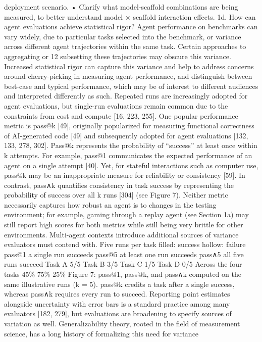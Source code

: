 deployment scenario.
• Clarify what model-scaffold combinations are being measured, to better understand model × scaffold
interaction effects.
1d. How can agent evaluations achieve statistical rigor?
Agent performance on benchmarks can vary widely, due to particular tasks selected into the benchmark, or
variance across different agent trajectories within the same task. Certain approaches to aggregating or
12
subsetting these trajectories may obscure this variance. Increased statistical rigor can capture this variance
and help to address concerns around cherry-picking in measuring agent performance, and distinguish
between best-case and typical performance, which may be of interest to different audiences and interpreted
differently as such.
Repeated runs are increasingly adopted for agent evaluations, but single-run evaluations remain common due
to the constraints from cost and compute [16, 223, 255]. One popular performance metric is pass@k [49],
originally popularized for measuring functional correctness of AI-generated code [49] and subsequently
adopted for agent evaluations [132, 133, 278, 302]. Pass@k represents the probability of “success” at least
once within k attempts. For example, pass@1 communicates the expected performance of an agent on a
single attempt [40]. Yet, for stateful interactions such as computer use, pass@k may be an inappropriate
measure for reliability or consistency [59]. In contrast, pass∧k quantifies consistency in task success by
representing the probability of success over all k runs [304] (see Figure 7). Neither metric necessarily
captures how robust an agent is to changes in the testing environment; for example, gaming through a
replay agent (see Section 1a) may still report high scores for both metrics while still being very brittle for
other environments. Multi-agent contexts introduce additional sources of variance evaluators must contend
with.
Five runs per task
filled: success
hollow: failure
pass@1
a single run
succeeds
pass@5
at least one run
succeeds
pass∧5
all five runs
succeed
Task A
5/5
Task B
3/5
Task C
1/5
Task D
0/5
Across the four tasks
45\%
75\%
25\%
Figure 7: pass@1, pass@k, and pass∧k computed on the same illustrative runs (k = 5). pass@k credits a task after
a single success, whereas pass∧k requires every run to succeed.
Reporting point estimates alongside uncertainty with error bars is a standard practice among many
evaluators [182, 279], but evaluations are broadening to specify sources of variation as well. Generalizability
theory, rooted in the field of measurement science, has a long history of formalizing this need for variance
